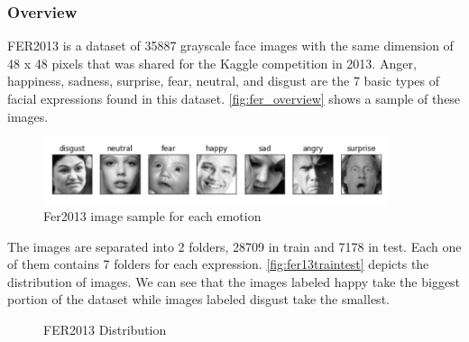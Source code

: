 \documentclass[12pt,a4paper,oneside,english]{book}
\begin{document}
\subsubsection{Overview}
FER2013 is a dataset of 35887 grayscale face images with the same dimension of 48 x 48 pixels that was shared for the Kaggle competition in 2013. Anger, happiness, sadness, surprise, fear, neutral, and disgust are the 7 basic types of facial expressions found in this dataset. \autoref{fig:fer_overview} shows a sample of these images.
\begin{figure}[H]
    \centering
    \includegraphics[width=0.9\textwidth]{figures/model/feroverview.jpg}
    \caption{Fer2013 image sample for each emotion}
    \label{fig:fer_overview}
\end{figure}
\noindent
The images are separated into 2 folders, 28709 in train and 7178 in test. Each one of them contains 7 folders for each expression. \autoref{fig:fer13traintest} depicts the distribution of images. We can see that the images labeled happy take the biggest portion of the dataset while images labeled disgust take the smallest.
\begin{figure}[H]
\begin{center}
\quad 
{}
\caption{FER2013 Distribution}
\label{fig:fer13traintest}
\end{center}
\end{figure}
\end{document}
